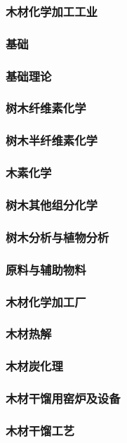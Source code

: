 \documentclass[UTF8]{../../ApplicationUniverse}
\begin{document}
\subsubsection{木材化学加工工业}
    \subsubsection{基础}
        \subsubsection{基础理论}
            \subsubsection{树木纤维素化学}
            \subsubsection{树木半纤维素化学}
            \subsubsection{木素化学}
            \subsubsection{树木其他组分化学}
            \subsubsection{树木分析与植物分析}
        \subsubsection{原料与辅助物料}
        \subsubsection{木材化学加工厂}
    \subsubsection{木材热解}
        \subsubsection{木材炭化理}
        \subsubsection{木材干馏用窑炉及设备}
        \subsubsection{木材干馏工艺}
\end{document}
